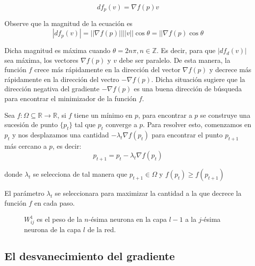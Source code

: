 $$ df_{p}(v) = \nabla f(p)v $$

Observe que la magnitud de la ecuación es
$$ |d f_{p}(v)| = ||\nabla f(p)|| ||v||\cos\theta = ||\nabla f(p)\cos\theta$$

Dicha magnitud es máxima cuando $\theta = 2n\pi, n \in \mathbb{Z}$. Es decir, para que $|df_{d}(v)|$ sea máxima, los vectores $\nabla f(p)$ y $v$ debe ser paralelo. De esta manera, la función $f$ crece más rápidamente en la dirección del vector $\nabla f(p)$ y decrece más rápidamente en la dirección del vectro $-\nabla f(p)$. Dicha situación sugiere que la dirección negativa del gradiente $-\nabla f(p)$ es una buena dirección de búsqueda para encontrar el minimizador de la función $f$.

Sea $f: \Omega \subseteq \mathbb{R} \rightarrow \mathbb{R}$, si $f$ tiene un mínimo en $p$, para encontrar a $p$ se construye una sucesión de punto $\{p_{t}\}$ tal que $p_{t}$ converge a $p$. Para resolver esto, comenzamos en $p_{t}$ y nos desplazamos una cantidad $-\lambda_{t}\nabla f(p_{t})$ para encontrar el punto $p_{t + 1}$ más cercano a $p$, es decir:
$$ p_{t + 1} =p_{t} - \lambda _{t}\nabla f(p_{t}) $$

donde $\lambda_{t}$ se selecciona de tal manera que $p_{t + 1} \in \Omega$ y $f(p_{t}) \geq f(p_{t + 1})$

El parámetro $\lambda_{t}$ se seleccionara para maximizar la cantidad a la que decrece la función $f$ en cada paso.


\begin{figure}[H]
	\centering
    \scalebox{0.6}{}
    \caption{$W^{1}_{ij}$ es el peso de la $n$-ésima neurona en la capa $l - 1$ a la $j$-ésima neurona de la capa $l$ de la red.}
\end{figure}

\subsection{El desvanecimiento del gradiente}
